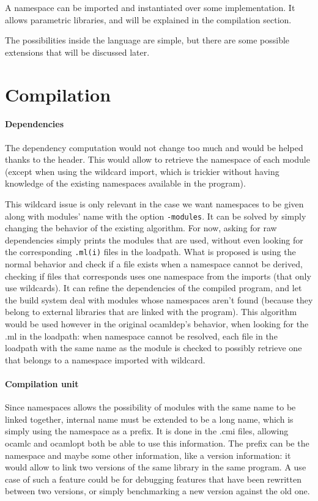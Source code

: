 \documentclass[11pt,a4paper]{article}
\begin{document}
A namespace can be imported and instantiated over some implementation. It allows
parametric libraries, and will be explained in the compilation section. 

The possibilities inside the language are simple, but there are some possible
extensions that will be discussed later.

\section{Compilation}

\paragraph{Dependencies}

The dependency computation would not change too much and would be helped thanks
to the header. This would allow to retrieve the namespace of each module (except
when using the wildcard import, which is trickier without having knowledge of
the existing namespaces available in the program).

This wildcard issue is only relevant in the case we want namespaces to be given
along with modules' name with the option \texttt{-modules}. It can be solved by
simply changing the behavior of the existing algorithm. For now, asking for raw
dependencies simply prints the modules that are used, without even looking for
the corresponding \texttt{.ml(i)} files in the loadpath. What is proposed is
using the normal behavior and check if a file exists when a namespace cannot be
derived, checking if files that corresponds uses one namespace from the imports
(that only use wildcards). It can refine the dependencies of the compiled
program, and let the build system deal with modules whose namespaces aren't
found (because they belong to external libraries that are linked with the
program). This algorithm would be used however in the original ocamldep's
behavior, when looking for the .ml in the loadpath: when namespace cannot be
resolved, each file in the loadpath with the same name as the module is checked
to possibly retrieve one that belongs to a namespace imported with wildcard.


\paragraph{Compilation unit}

Since namespaces allows the possibility of modules with the same name to be
linked together, internal name must be extended to be a long name, which is simply
using the namespace as a prefix. It is done in the .cmi files, allowing ocamlc
and ocamlopt both be able to use this information. The prefix can be the
namespace and maybe some other information, like a version information: it would
allow to link two versions of the same library in the same program. A use case
of such a feature could be for debugging features that have been rewritten
between two versions, or simply benchmarking a new version against the old one.
\end{document}
